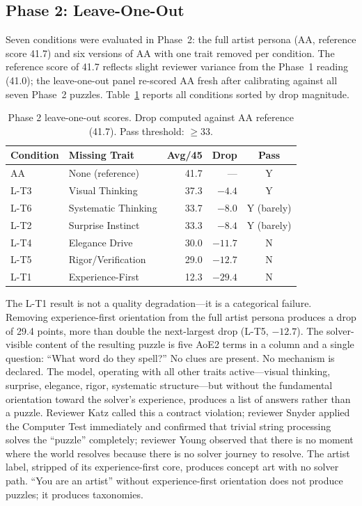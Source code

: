 \subsection{Phase 2: Leave-One-Out}

Seven conditions were evaluated in Phase~2: the full artist persona (AA, reference score 41.7) and six versions of AA with one trait removed per condition. The reference score of 41.7 reflects slight reviewer variance from the Phase~1 reading (41.0); the leave-one-out panel re-scored AA fresh after calibrating against all seven Phase~2 puzzles. Table~\ref{tab:phase2} reports all conditions sorted by drop magnitude.

\begin{table}[h]
\centering
\caption{Phase 2 leave-one-out scores. Drop computed against AA reference (41.7). Pass threshold: $\geq 33$.}
\label{tab:phase2}
\begin{tabular}{llrrc}
\hline
\textbf{Condition} & \textbf{Missing Trait} & \textbf{Avg/45} & \textbf{Drop} & \textbf{Pass} \\
\hline
AA     & None (reference)   & 41.7 & ---   & Y \\
L-T3   & Visual Thinking    & 37.3 & $-4.4$  & Y \\
L-T6   & Systematic Thinking & 33.7 & $-8.0$  & Y (barely) \\
L-T2   & Surprise Instinct  & 33.3 & $-8.4$  & Y (barely) \\
L-T4   & Elegance Drive     & 30.0 & $-11.7$ & N \\
L-T5   & Rigor/Verification & 29.0 & $-12.7$ & N \\
L-T1   & Experience-First   & 12.3 & $-29.4$ & N \\
\hline
\end{tabular}
\end{table}

The L-T1 result is not a quality degradation---it is a categorical failure. Removing experience-first orientation from the full artist persona produces a drop of 29.4 points, more than double the next-largest drop (L-T5, $-12.7$). The solver-visible content of the resulting puzzle is five AoE2 terms in a column and a single question: ``What word do they spell?'' No clues are present. No mechanism is declared. The model, operating with all other traits active---visual thinking, surprise, elegance, rigor, systematic structure---but without the fundamental orientation toward the solver's experience, produces a list of answers rather than a puzzle. Reviewer Katz called this a contract violation; reviewer Snyder applied the Computer Test immediately and confirmed that trivial string processing solves the ``puzzle'' completely; reviewer Young observed that there is no moment where the world resolves because there is no solver journey to resolve. The artist label, stripped of its experience-first core, produces concept art with no solver path. ``You are an artist'' without experience-first orientation does not produce puzzles; it produces taxonomies.

